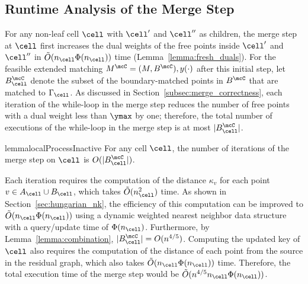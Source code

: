 
\subsection{Runtime Analysis of the Merge Step} 
For any non-leaf cell $\cell$ with $\cell'$ and $\cell''$ as children, the merge step at $\cell$ first increases the dual weights of the free points inside $\cell'$ and $\cell''$ in $\tilde{O}(n_\cell\Phi(n_\cell))$ time (Lemma~\ref{lemma:fresh_duals}). For the feasible extended matching $M^\mcC=(M, B^\mcC), y(\cdot)$ after this initial step, let $B^\mcC_\cell$ denote the subset of the boundary-matched points in $B^\mcC$ that are matched to $\Gamma_\cell$. As discussed in Section~\ref{subsec:merge_correctness}, each iteration of the while-loop in the merge step reduces the number of free points with a dual weight less than $\ymax$ by one; therefore, the total number of executions of the while-loop in the merge step is at most $|B^\mcC_\cell|$.

\begin{restatable}{lemma}{localProcessInactive}\label{lemma:local-inactive}
    For any cell $\cell$, the number of iterations of the merge step on $\cell$ is $O(|B^\mcC_\cell|)$.
\end{restatable}

Each iteration requires the computation of the distance $\kappa_v$ for each point $v\in A_\cell\cup B_\cell$, which takes $\tilde{O}(n_\cell^2)$ time. As shown in Section~\ref{sec:hungarian_nk}, the efficiency of this computation can be improved to $\tilde{O}(n_\cell\Phi(n_\cell))$ using a dynamic weighted nearest neighbor data structure with a query/update time of $\Phi(n_\cell)$. Furthermore, by Lemma~\ref{lemma:combination}, $|B_{\cell}^\mcC|=O(n^{4/5})$. Computing the updated key of $\cell$ also requires the computation of the distance of each point from the source in the residual graph, which also takes $\tilde{O}(n_\cell\Phi(n_\cell))$ time. Therefore, the total execution time of the merge step would be $\tilde{O}(n^{4/5}n_\cell\Phi(n_\cell))$.




